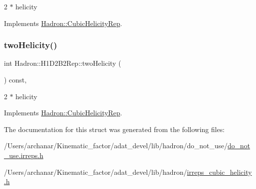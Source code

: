 2 $\ast$ helicity 

Implements \mbox{\hyperlink{structHadron_1_1CubicHelicityRep_af507aa56fc2747eacc8cb6c96db31ecc}{Hadron\+::\+Cubic\+Helicity\+Rep}}.

\mbox{\label{structHadron_1_1H1D2B2Rep_ac30c0bcd58285d8b5786f2fbfe58ffa2}} 
\subsubsection{\texorpdfstring{twoHelicity()}{twoHelicity()}\hspace{0.1cm}{\footnotesize\ttfamily [2/2]}}
{\footnotesize\ttfamily int Hadron\+::\+H1\+D2\+B2\+Rep\+::two\+Helicity (\begin{DoxyParamCaption}{ }\end{DoxyParamCaption}) const\hspace{0.3cm}{\ttfamily [inline]}, {\ttfamily [virtual]}}

2 $\ast$ helicity 

Implements \mbox{\hyperlink{structHadron_1_1CubicHelicityRep_af507aa56fc2747eacc8cb6c96db31ecc}{Hadron\+::\+Cubic\+Helicity\+Rep}}.



The documentation for this struct was generated from the following files\+:\begin{DoxyCompactItemize}
\item 
/\+Users/archanar/\+Kinematic\+\_\+factor/adat\+\_\+devel/lib/hadron/do\+\_\+not\+\_\+use/\mbox{\hyperlink{do__not__use_8irreps_8h}{do\+\_\+not\+\_\+use.\+irreps.\+h}}\item 
/\+Users/archanar/\+Kinematic\+\_\+factor/adat\+\_\+devel/lib/hadron/\mbox{\hyperlink{lib_2hadron_2irreps__cubic__helicity_8h}{irreps\+\_\+cubic\+\_\+helicity.\+h}}\end{DoxyCompactItemize}
